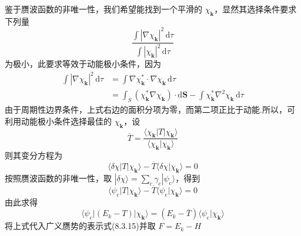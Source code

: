 鉴于赝波函数的非唯一性，我们希望能找到一个平滑的 $\chi_{\boldsymbol{k}}$，显然其选择条件要求下列量
\begin{equation}
  \frac{\int|\nabla\chi_{\boldsymbol{k}}|^{2}\,\mathrm{d}\tau}{\int|\chi_{\boldsymbol{k}}|^{2}\,\mathrm{d}\tau}
\end{equation}
为极小，此要求等效于动能极小条件，因为
\begin{equation}
\begin{aligned}
  \int|\nabla\chi_{\boldsymbol{k}}|^{2}\,\mathrm{d}\tau
  &=\int\nabla\chi_{\boldsymbol{k}}^{*}\cdot\nabla\chi_{\boldsymbol{k}}\,\mathrm{d}\tau\\
  &=\int_{S}(\chi_{\boldsymbol{k}}^{*}\nabla\chi_{\boldsymbol{k}})\cdot\mathrm{d}\boldsymbol{S}
  -\int\chi_{\boldsymbol{k}}^{*}\nabla^{2}\chi_{\boldsymbol{k}}\,\mathrm{d}\tau
\end{aligned}
\end{equation}
由于周期性边界条件，上式右边的面积分项为零，而第二项正比于动能.所以，可利用动能极小条件选择最佳的 $\chi_{\boldsymbol{k}}$，设
\begin{equation}
  \overline{T}=\frac{\langle\chi_{\boldsymbol{k}}|T|\chi_{\boldsymbol{k}}\rangle}{\langle\chi_{\boldsymbol{k}}|\chi_{\boldsymbol{k}}\rangle}
\end{equation}
则其变分方程为
\begin{equation}
  \langle\delta\chi|T|\chi_{\boldsymbol{k}}\rangle-\overline{T}\langle\delta\chi|\chi_{\boldsymbol{k}}\rangle=0
\end{equation}
按照赝波函数的非唯一性，取 $|\delta\chi\rangle=\sum_{\mathrm{c}}\gamma_{\mathrm{c}}|\psi_{\mathrm{c}}\rangle$，得到
\begin{equation}
  \langle\psi_{\mathrm{c}}|T|\chi_{\boldsymbol{k}}\rangle-\overline{T}\langle\psi_{\mathrm{c}}|\chi_{\boldsymbol{k}}\rangle=0
\end{equation}
由此求得
\begin{equation}
  \langle\psi_{\mathrm{c}}|(E_{k}-T)|\chi_{\boldsymbol{k}}\rangle
  =(E_{k}-\overline{T})\langle\psi_{\mathrm{c}}|\chi_{\boldsymbol{k}}\rangle
\end{equation}
将上式代入广义赝势的表示式(8.3.15)并取 $F=E_{k}-H$
